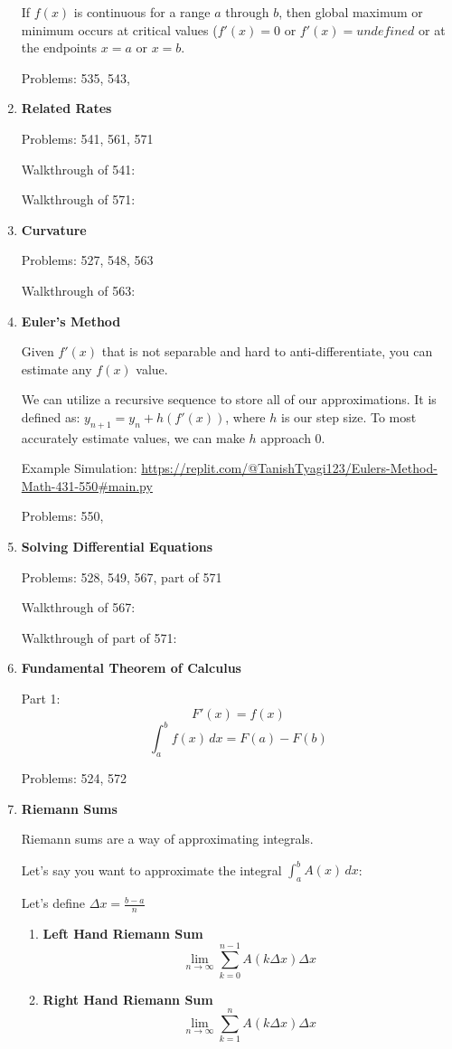 \documentclass{article}
\begin{document}
\begin{enumerate}
If $f(x)$ is continuous for a range $a$ through $b$, then global maximum or minimum occurs at critical values ($f'(x) = 0$ or $f'(x) = undefined$ or at the endpoints $x = a$ or $x = b$.

Problems: 535, 543, 

\item \textbf{Related Rates}

Problems: 541, 561, 571

Walkthrough of 541: 

Walkthrough of 571: 

\item \textbf{Curvature} 

Problems: 527, 548, 563

Walkthrough of 563:

\item \textbf{Euler's Method}

Given $f'(x)$ that is not separable and hard to anti-differentiate, you can estimate any $f(x)$ value. 

We can utilize a recursive sequence to store all of our approximations. It is defined as: $y_{n+1} = y_{n} + h(f'(x))$, where $h$ is our step size. To most accurately estimate values, we can make $h$ approach 0.

Example Simulation: \url{https://replit.com/@TanishTyagi123/Eulers-Method-Math-431-550#main.py}

Problems: 550, 

\item \textbf{Solving Differential Equations}

Problems: 528, 549, 567, part of 571

Walkthrough of 567: 

Walkthrough of part of 571:


\item \textbf{Fundamental Theorem of Calculus} 

Part 1: 
$$ F'(x) = f(x) $$
$$ \int_{a}^{b} f(x) \,dx = F(a) - F(b) $$

Problems: 524, 572

\item \textbf{Riemann Sums}

Riemann sums are a way of approximating integrals. 

Let's say you want to approximate the integral $\int_{a}^{b} A(x) \,dx$: 

Let's define $\Delta x = \frac{b - a}{n}$

    \begin{enumerate}
    \item \textbf{Left Hand Riemann Sum}
$$
\lim_{n\to\infty} \sum_{k=0} ^{n-1} A(k\Delta x)\Delta x 
$$
    \item \textbf{Right Hand Riemann Sum}
$$
\lim_{n\to\infty} \sum_{k=1} ^{n} A(k\Delta x)\Delta x 
$$


\end{enumerate}
\end{enumerate}
\end{document}
